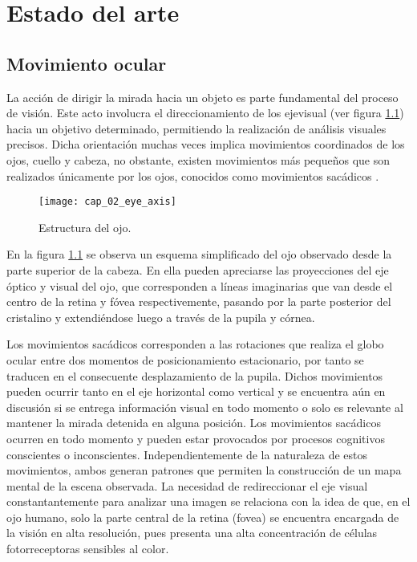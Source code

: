 \documentclass[../main.tex]{subfiles}
\begin{document}
		
\chapter{Estado del arte}
\label{cha:02_estado_del_arte}

	\section{Movimiento ocular}
	\label{sec:02_movimiento_ocular}
		La acción de dirigir la mirada hacia un objeto es parte fundamental del proceso de visión. Este acto involucra el direccionamiento de los \gls{ejevisual} (ver figura \ref{fig:02_eye_axis}) hacia un objetivo determinado, permitiendo la realización de análisis visuales precisos. Dicha orientación muchas veces implica movimientos coordinados de los ojos, cuello y cabeza, no obstante, existen movimientos más pequeños que son realizados únicamente por los ojos, conocidos como movimientos sacádicos \cite{article:movOcular1, article:movOcular2}.
		\begin{figure}[H]
			\centering
			\texttt{[image: cap\_02\_eye\_axis]}
			\caption[Estructura del ojo]{Estructura del ojo\footnotemark.}
			\label{fig:02_eye_axis}
		\end{figure}

		En la figura \ref{fig:02_eye_axis} se observa un esquema simplificado del ojo observado desde la parte superior de la cabeza. En ella pueden apreciarse las proyecciones del eje óptico y visual del ojo, que corresponden a líneas imaginarias que van desde el centro de la retina y fóvea respectivemente, pasando por la parte posterior del cristalino y extendiéndose luego a través de la pupila y córnea.  

		Los movimientos sacádicos corresponden a las rotaciones que realiza el globo ocular entre dos momentos de posicionamiento estacionario, por tanto se traducen en el consecuente desplazamiento de la pupila. Dichos movimientos pueden ocurrir tanto en el eje horizontal como vertical y se encuentra aún en discusión \cite{article:movOcular2, article:movOcular3} si se entrega información visual en todo momento o solo es relevante al mantener la mirada detenida en alguna posición. Los movimientos sacádicos ocurren en todo momento y pueden estar provocados por procesos cognitivos conscientes o inconscientes. Independientemente de la naturaleza de estos movimientos, ambos generan patrones que permiten la construcción de un mapa mental de la escena observada. La necesidad de redireccionar el eje visual constantantemente para analizar una imagen se relaciona con la idea de que, en el ojo humano, solo la parte central de la retina (\gls{fovea}) se encuentra encargada de la visión en alta resolución, pues presenta una alta concentración de células fotorreceptoras sensibles al color. 
\end{document}
